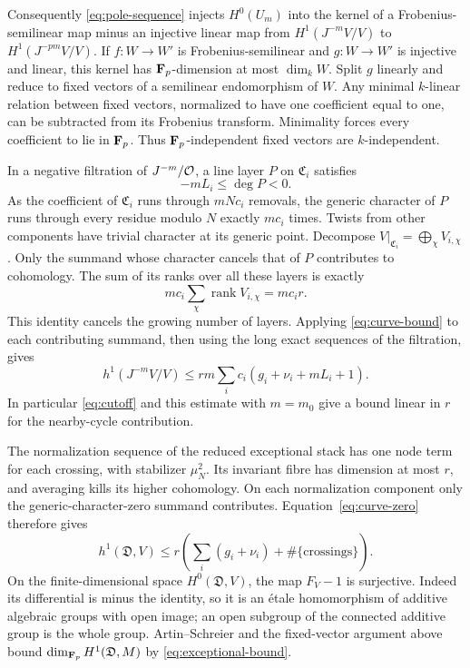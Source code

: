 Consequently \eqref{eq:pole-sequence} injects $H^0(U_m)$ into the kernel of a Frobenius-semilinear map minus an injective linear map from $H^1(J^{-m}V/V)$ to $H^1(J^{-pm}V/V)$. If $f:W\to W'$ is Frobenius-semilinear and $g:W\to W'$ is injective and linear, this kernel has $\mathbf F_p$-dimension at most $\dim_kW$. Split $g$ linearly and reduce to fixed vectors of a semilinear endomorphism of $W$. Any minimal $k$-linear relation between fixed vectors, normalized to have one coefficient equal to one, can be subtracted from its Frobenius transform. Minimality forces every coefficient to lie in $\mathbf F_p$. Thus $\mathbf F_p$-independent fixed vectors are $k$-independent.

In a negative filtration of $J^{-m}/\mathcal O$, a line layer $P$ on $\mathfrak C_i$ satisfies
\[
 -mL_i\leq\deg P<0.
\]
As the coefficient of $\mathfrak C_i$ runs through $mNc_i$ removals, the generic character of $P$ runs through every residue modulo $N$ exactly $mc_i$ times. Twists from other components have trivial character at its generic point. Decompose $V|_{\mathfrak C_i}=\bigoplus_\chi V_{i,\chi}$. Only the summand whose character cancels that of $P$ contributes to cohomology. The sum of its ranks over all these layers is exactly
\[
 mc_i\sum_\chi\operatorname{rank}V_{i,\chi}=mc_i r.
\]
This identity cancels the growing number of layers. Applying \eqref{eq:curve-bound} to each contributing summand, then using the long exact sequences of the filtration, gives
\begin{equation}\label{eq:low-pole-bound}
 h^1(J^{-m}V/V)\leq r m\sum_i c_i(g_i+\nu_i+mL_i+1).
\end{equation}
In particular \eqref{eq:cutoff} and this estimate with $m=m_0$ give a bound linear in $r$ for the nearby-cycle contribution.

The normalization sequence of the reduced exceptional stack has one node term for each crossing, with stabilizer $\mu_N^2$. Its invariant fibre has dimension at most $r$, and averaging kills its higher cohomology. On each normalization component only the generic-character-zero summand contributes. Equation~\eqref{eq:curve-zero} therefore gives
\begin{equation}\label{eq:exceptional-bound}
 h^1(\mathfrak D,V)\leq
 r\left(\sum_i(g_i+\nu_i)+\#\{\text{crossings}\}\right).
\end{equation}
On the finite-dimensional space $H^0(\mathfrak D,V)$, the map $F_V-1$ is surjective. Indeed its differential is minus the identity, so it is an \'etale homomorphism of additive algebraic groups with open image; an open subgroup of the connected additive group is the whole group. Artin--Schreier and the fixed-vector argument above bound $\dim_{\mathbf F_p}H^1(\mathfrak D,M)$ by \eqref{eq:exceptional-bound}.

